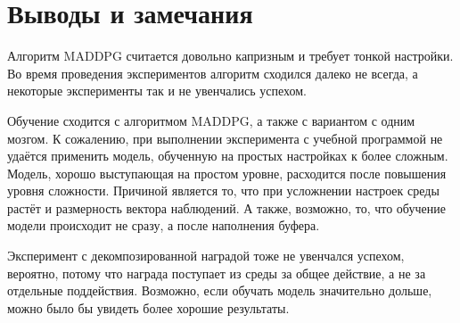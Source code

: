 





\section{Выводы и замечания}

Алгоритм MADDPG считается довольно капризным и требует тонкой настройки. Во время проведения экспериментов алгоритм сходился далеко не всегда, а некоторые эксперименты так и не увенчались успехом.

Обучение сходится с алгоритмом MADDPG, а также с вариантом с одним мозгом. К сожалению, при выполнении эксперимента с учебной программой не удаётся применить модель, обученную на простых настройках к более сложным. Модель, хорошо выступающая на простом уровне, расходится после повышения уровня сложности. Причиной является то, что при усложнении настроек среды растёт и размерность вектора наблюдений. А также, возможно, то, что обучение модели происходит не сразу, а после наполнения буфера.

Эксперимент с декомпозированной наградой тоже не увенчался успехом, вероятно, потому что награда поступает из среды за общее действие, а не за отдельные поддействия. Возможно, если обучать модель значительно дольше, можно было бы увидеть более хорошие результаты.


\newpage
